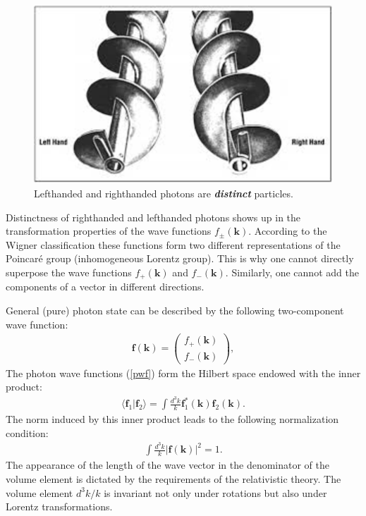 \documentclass[onecolumn,aps,pra,12pt]{revtex4-1}
\begin{document}
\begin{figure}
\includegraphics[scale=0.95]{Fig2.eps}
\caption{Lefthanded and righthanded photons are {\bf\em distinct} particles.}
\end{figure}

Distinctness of righthanded and lefthanded photons shows up \cite{qm} in the transformation properties of the wave functions $f_\pm(\bm k)$. According to the Wigner classification \cite{wig} these functions form two different representations of the Poincar\'e group (inhomogeneous Lorentz group). This is why one cannot directly superpose the wave functions $f_+(\bm k)$ and $f_-(\bm k)$. Similarly, one cannot add the components of a vector in different directions.

General (pure) photon state can be described by the following two-component wave function:
\begin{align}\label{pwf}
{\mathfrak{\bm{f}}({\bm k})}=\left(\begin{array}{c}f_+({\bm k})\\f_-({\bm k})\end{array}\right),
\end{align}
The photon wave functions (\ref{pwf}) form the Hilbert space endowed with the inner product:
\begin{align}\label{spr}
\langle{\mathfrak{\bm{f}}_1}|{\mathfrak{\bm{f}}_2}\rangle
=\int\!\frac{d^3k}{k}{\mathfrak{\bm{f}}_1^*({\bm k})}{\mathfrak{\bm{f}}_2({\bm k})}.
\end{align}
The norm induced by this inner product leads to the following normalization condition:
\begin{align}\label{norm}
\int\!\frac{d^3k}{k}|{\mathfrak{\bm{f}}({\bm k})}|^2=1.
\end{align}
The appearance of the length of the wave vector in the denominator of the volume element is dictated by the requirements of the relativistic theory. The volume element $d^3k/k$ is invariant not only under rotations but also under Lorentz transformations.
\end{document}
